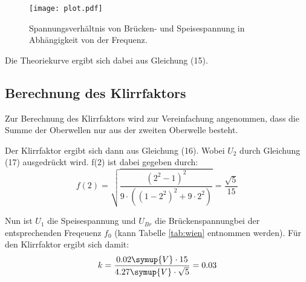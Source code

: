 \begin{figure}[H]
  \centering
  \texttt{[image: plot.pdf]}
  \caption{Spannungsverhältnis von Brücken- und Speisespannung in Abhängigkeit von der Frequenz.}
  \label{fig:plot}
\end{figure}

Die Theoriekurve ergibt sich dabei aus Gleichung (15).

\subsection{Berechnung des Klirrfaktors}
Zur Berechnung des Klirrfaktors wird zur Vereinfachung angenommen, dass die Summe
der Oberwellen nur aus der zweiten Oberwelle besteht.

Der Klirrfaktor ergibt sich dann aus Gleichung (16). Wobei $U_2$ durch Gleichung
(17) ausgedrückt wird. f(2) ist dabei gegeben durch:
\begin{equation*}
  f(2) = \sqrt{\frac{(2^2-1)^2}{9\cdot((1-2^2)^2+9\cdot2^2)}} = \frac{\sqrt{5}}{15}
\end{equation*}

Nun ist $U_1$ die Speisespannung und $U_{Br}$ die Brückenspannungbei der entsprechenden Freqeuenz $f_0$
(kann Tabelle \ref{tab:wien} entnommen werden). Für den Klirrfaktor ergibt sich damit:
\begin{equation*}
  k = \frac{0.02\symup{V}\cdot15}{4.27\symup{V}\cdot\sqrt{5}} = 0.03
\end{equation*}

